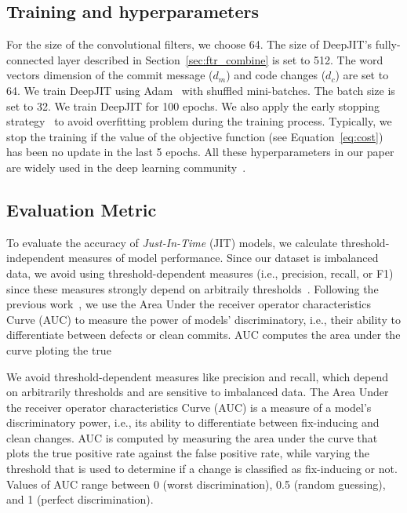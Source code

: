 \subsection{Training and hyperparameters}
\label{sec:training_parameters}
For the size of the convolutional filters, we choose 64. The size of DeepJIT's fully-connected layer described in Section~\ref{sec:ftr_combine} is set to 512. The word vectors dimension of the commit message ($d_m$) and code changes ($d_c$) are set to 64. We train DeepJIT using Adam~\cite{kingma2014adam} with shuffled mini-batches.  The batch size is set to 32. We train DeepJIT for 100 epochs. We also apply the early stopping strategy~\cite{prechelt1998automatic, caruana2001overfitting} to avoid overfitting problem during the training process. Typically, we stop the training if the value of the objective function (see Equation~\ref{eq:cost}) has been no update in the last 5 epochs. All these hyperparameters in our paper are widely used in the deep learning community~\cite{severyn2015learning, huo2016learning, huo2017enhancing, hinton2012improving}. 
 
\subsection{Evaluation Metric}
\label{sec:metric}
To evaluate the accuracy of \emph{Just-In-Time} (JIT) models, we calculate  threshold-independent measures of model performance. Since our dataset is imbalanced data, we avoid using threshold-dependent measures (i.e., precision, recall, or F1) since these measures strongly depend on arbitraily thresholds~\cite{nguyen2009learning, gu2008data}. Following the previous work~\cite{mcintosh2018fix},  we use the Area Under the receiver operator characteristics
Curve (AUC) to measure the power of models' discriminatory, i.e., their ability to differentiate between defects or clean commits. AUC computes the area under the curve ploting the true 

We
avoid threshold-dependent measures like precision and recall, which depend on arbitrarily thresholds and are sensitive to imbalanced data.
The Area Under the receiver operator characteristics
Curve (AUC) is a measure of a model’s discriminatory power,
i.e., its ability to differentiate between fix-inducing and clean
changes. AUC is computed by measuring the area under
the curve that plots the true positive rate against the false
positive rate, while varying the threshold that is used to
determine if a change is classified as fix-inducing or not.
Values of AUC range between 0 (worst discrimination), 0.5
(random guessing), and 1 (perfect discrimination).


